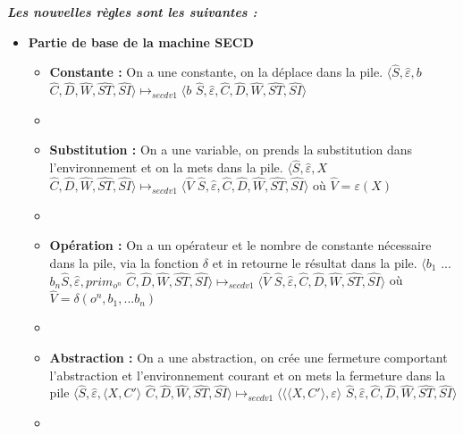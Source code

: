 \documentclass[10pt,a4paper]{article}
\begin{document}
					
					\textbf{\textit{Les nouvelles règles sont les suivantes :}}
					\smallbreak
					\begin{itemize}
						\item[] \textbf{Partie de base de la machine SECD}
						\begin{itemize}
							\item[] \textbf{Constante :} On a une constante, on la déplace dans la pile. 
							\smallbreak
							$\langle\widehat{S},\widehat{\varepsilon},b$ $\widehat{C},\widehat{D},\widehat{W},\widehat{ST},\widehat{SI}\rangle 
							\longmapsto_{secdv1} 
							\langle b$ $\widehat{S},\widehat{\varepsilon},\widehat{C},\widehat{D},\widehat{W},\widehat{ST},\widehat{SI}\rangle$
							\item[]
							\item[] \textbf{Substitution :} On a une variable, on prends la substitution dans l'environnement et on la mets dans la pile.  
							\smallbreak $\langle\widehat{S},\widehat{\varepsilon},X$ $\widehat{C},\widehat{D},\widehat{W},\widehat{ST},\widehat{SI}\rangle 
							\longmapsto_{secdv1} 
							\langle \widehat{V}$ $\widehat{S},\widehat{\varepsilon},\widehat{C},\widehat{D},\widehat{W},\widehat{ST},\widehat{SI}\rangle$ 
							où $\widehat{V} = \varepsilon(X)$
							\item[]
							\item[] \textbf{Opération :} On a un opérateur et le nombre de constante nécessaire dans la pile, via la fonction $\delta$ et in retourne le résultat dans la pile. 
							\smallbreak
							$\langle b_{1}$ $...$ $b_{n}\widehat{S},\widehat{\varepsilon},prim_{o^{n}}$ $\widehat{C},\widehat{D},\widehat{W},\widehat{ST},\widehat{SI}\rangle 
							\longmapsto_{secdv1} 
							\langle \widehat{V}$ $\widehat{S},\widehat{\varepsilon},\widehat{C},\widehat{D},\widehat{W},\widehat{ST},\widehat{SI}\rangle$ 
							où $\widehat{V} = \delta(o^{n},b_1,...b_{n})$
							\item[]
							\item[] \textbf{Abstraction :} On a une abstraction, on crée une fermeture comportant l'abstraction et l'environnement courant et on mets la fermeture dans la pile
							\smallbreak
							$\langle\widehat{S},\widehat{\varepsilon},\langle X,C'\rangle$ $\widehat{C},\widehat{D},\widehat{W},\widehat{ST},\widehat{SI}\rangle 
							\longmapsto_{secdv1} 
							\langle\langle\langle X,C'\rangle,\varepsilon\rangle$ $\widehat{S},\widehat{\varepsilon},\widehat{C},\widehat{D},\widehat{W},\widehat{ST},\widehat{SI}\rangle$
							\item[]

\end{itemize}
\end{itemize}
\end{document}
